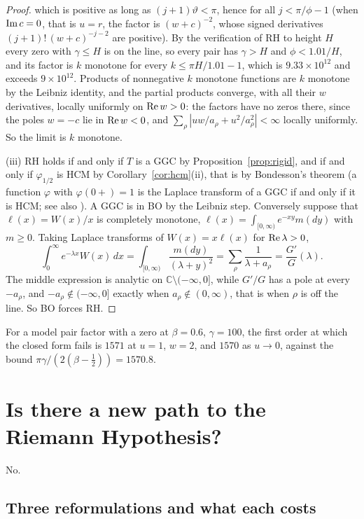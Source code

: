 \begin{proof}
which is positive as long as $(j+1)\vartheta<\pi$, hence for all $j<\pi/\phi-1$ (when $\operatorname{Im} c=0$, that is $u=r$, the factor is $(w+c)^{-2}$, whose signed derivatives $(j+1)!\,(w+c)^{-j-2}$ are positive). By the verification of RH to height $H$ \cite{PT21} every zero with $\gamma\leq H$ is on the line, so every pair has $\gamma>H$ and $\phi<1.01/H$, and its factor is $k$ monotone for every $k\leq\pi H/1.01-1$, which is $9.33\times10^{12}$ and exceeds $9\times10^{12}$. Products of nonnegative $k$ monotone functions are $k$ monotone by the Leibniz identity, and the partial products converge, with all their $w$ derivatives, locally uniformly on $\operatorname{Re} w>0$: the factors have no zeros there, since the poles $w=-c$ lie in $\operatorname{Re} w<0$, and $\sum_\rho|uw/a_\rho+u^2/a_\rho^2|<\infty$ locally uniformly. So the limit is $k$ monotone.

(iii) RH holds if and only if $T$ is a GGC by Proposition~\ref{prop:rigid}, and if and only if $\varphi_{1/2}$ is HCM by Corollary~\ref{cor:hcm}(ii), that is by Bondesson's theorem \cite[Theorem 6.1.1]{Bondesson} (a function $\varphi$ with $\varphi(0+)=1$ is the Laplace transform of a GGC if and only if it is HCM; see also \cite{JRY}). A GGC is in BO by the Leibniz step. Conversely suppose that $\ell(x)=W(x)/x$ is completely monotone, $\ell(x)=\int_{[0,\infty)}e^{-xy}m(dy)$ with $m\geq0$. Taking Laplace transforms of $W(x)=x\ell(x)$ for $\operatorname{Re}\lambda>0$,
\[
\int_0^\infty e^{-\lambda x}W(x)\,dx=\int_{[0,\infty)}\frac{m(dy)}{(\lambda+y)^2}=\sum_\rho\frac1{\lambda+a_\rho}=\frac{G'}G(\lambda).
\]
The middle expression is analytic on $\mathbb C\setminus(-\infty,0]$, while $G'/G$ has a pole at every $-a_\rho$, and $-a_\rho\notin(-\infty,0]$ exactly when $a_\rho\notin(0,\infty)$, that is when $\rho$ is off the line. So BO forces RH.
\end{proof}

For a model pair factor with a zero at $\beta=0.6$, $\gamma=100$, the first order at which the closed form fails is $1571$ at $u=1$, $w=2$, and $1570$ as $u\to0$, against the bound $\pi\gamma/(2(\beta-\frac12))=1570.8$.

\section{Is there a new path to the Riemann Hypothesis?}\label{mw:sec:path}

No.

\subsection{Three reformulations and what each costs}

